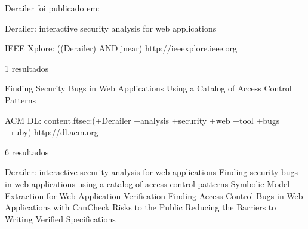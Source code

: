 Derailer foi publicado em:

Derailer: interactive security analysis for web applications

IEEE Xplore: ((Derailer) AND jnear)
http://ieeexplore.ieee.org

1 resultados

Finding Security Bugs in Web Applications Using a Catalog of Access Control Patterns

ACM DL: content.ftsec:(+Derailer +analysis +security +web +tool +bugs +ruby)
http://dl.acm.org

6 resultados

Derailer: interactive security analysis for web applications
Finding security bugs in web applications using a catalog of access control patterns 
Symbolic Model Extraction for Web Application Verification
Finding Access Control Bugs in Web Applications with CanCheck
Risks to the Public
Reducing the Barriers to Writing Verified Specifications
